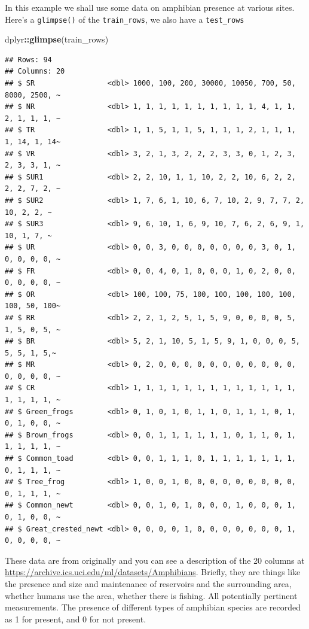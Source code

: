 \documentclass[
]{book}
\newenvironment{Shaded}{\begin{snugshade}}{\end{snugshade}}
\newcommand{\KeywordTok}[1]{\textcolor[rgb]{0.13,0.29,0.53}{\textbf{#1}}}
\newcommand{\NormalTok}[1]{#1}
\newcommand{\OperatorTok}[1]{\textcolor[rgb]{0.81,0.36,0.00}{\textbf{#1}}}
\begin{document}
In this example we shall use some data on amphibian presence at various sites. Here's a \texttt{glimpse()} of the \texttt{train\_rows}, we also have a \texttt{test\_rows}

\begin{Shaded}
\begin{Highlighting}[]
\NormalTok{dplyr}\OperatorTok{::}\KeywordTok{glimpse}\NormalTok{(train_rows)}
\end{Highlighting}
\end{Shaded}

\begin{verbatim}
## Rows: 94
## Columns: 20
## $ SR                 <dbl> 1000, 100, 200, 30000, 10050, 700, 50, 8000, 2500, ~
## $ NR                 <dbl> 1, 1, 1, 1, 1, 1, 1, 1, 1, 1, 4, 1, 1, 2, 1, 1, 1, ~
## $ TR                 <dbl> 1, 1, 5, 1, 1, 5, 1, 1, 1, 2, 1, 1, 1, 1, 14, 1, 14~
## $ VR                 <dbl> 3, 2, 1, 3, 2, 2, 2, 3, 3, 0, 1, 2, 3, 2, 3, 3, 1, ~
## $ SUR1               <dbl> 2, 2, 10, 1, 1, 10, 2, 2, 10, 6, 2, 2, 2, 2, 7, 2, ~
## $ SUR2               <dbl> 1, 7, 6, 1, 10, 6, 7, 10, 2, 9, 7, 7, 2, 10, 2, 2, ~
## $ SUR3               <dbl> 9, 6, 10, 1, 6, 9, 10, 7, 6, 2, 6, 9, 1, 10, 1, 7, ~
## $ UR                 <dbl> 0, 0, 3, 0, 0, 0, 0, 0, 0, 0, 3, 0, 1, 0, 0, 0, 0, ~
## $ FR                 <dbl> 0, 0, 4, 0, 1, 0, 0, 0, 1, 0, 2, 0, 0, 0, 0, 0, 0, ~
## $ OR                 <dbl> 100, 100, 75, 100, 100, 100, 100, 100, 100, 50, 100~
## $ RR                 <dbl> 2, 2, 1, 2, 5, 1, 5, 9, 0, 0, 0, 0, 5, 1, 5, 0, 5, ~
## $ BR                 <dbl> 5, 2, 1, 10, 5, 1, 5, 9, 1, 0, 0, 0, 5, 5, 5, 1, 5,~
## $ MR                 <dbl> 0, 2, 0, 0, 0, 0, 0, 0, 0, 0, 0, 0, 0, 0, 0, 0, 0, ~
## $ CR                 <dbl> 1, 1, 1, 1, 1, 1, 1, 1, 1, 1, 1, 1, 1, 1, 1, 1, 1, ~
## $ Green_frogs        <dbl> 0, 1, 0, 1, 0, 1, 1, 0, 1, 1, 1, 0, 1, 0, 1, 0, 0, ~
## $ Brown_frogs        <dbl> 0, 0, 1, 1, 1, 1, 1, 1, 0, 1, 1, 0, 1, 1, 1, 1, 1, ~
## $ Common_toad        <dbl> 0, 0, 1, 1, 1, 0, 1, 1, 1, 1, 1, 1, 1, 0, 1, 1, 1, ~
## $ Tree_frog          <dbl> 1, 0, 0, 1, 0, 0, 0, 0, 0, 0, 0, 0, 0, 0, 1, 1, 1, ~
## $ Common_newt        <dbl> 0, 0, 1, 0, 1, 0, 0, 0, 1, 0, 0, 0, 1, 0, 1, 0, 0, ~
## $ Great_crested_newt <dbl> 0, 0, 0, 0, 1, 0, 0, 0, 0, 0, 0, 0, 1, 0, 0, 0, 0, ~
\end{verbatim}

These data are from \citep{frogs} originally and you can see a description of the 20 columns at \url{https://archive.ics.uci.edu/ml/datasets/Amphibians}. Briefly, they are things like the presence and size and maintenance of reservoirs and the surrounding area, whether humans use the area, whether there is fishing. All potentially pertinent measurements. The presence of different types of amphibian species are recorded as 1 for present, and 0 for not present.
\end{document}
